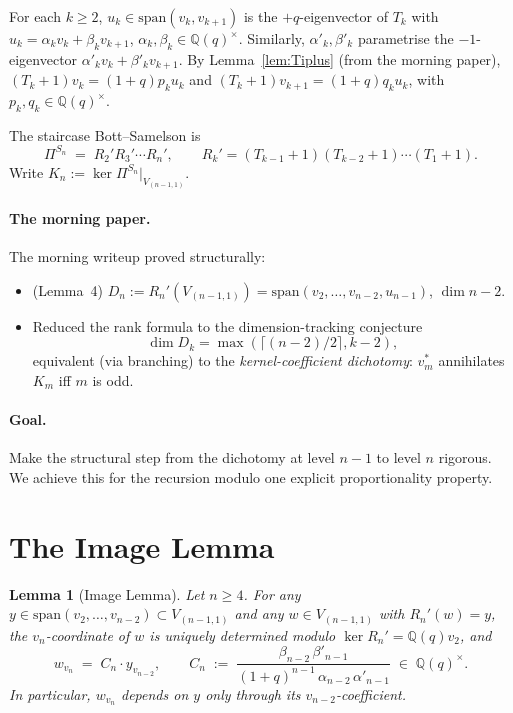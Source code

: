 \documentclass[11pt]{article}
\newtheorem{lemma}[theorem]{Lemma}
\theoremstyle{definition}
\begin{document}
For each $k \ge 2$, $u_k \in \mathrm{span}(v_k, v_{k+1})$ is the
$+q$-eigenvector of $T_k$ with $u_k = \alpha_k v_k + \beta_k v_{k+1}$,
$\alpha_k, \beta_k \in \mathbb{Q}(q)^\times$. Similarly, $\alpha'_k, \beta'_k$
parametrise the $-1$-eigenvector $\alpha'_k v_k + \beta'_k v_{k+1}$.
By Lemma~\ref{lem:Tiplus} (from the morning paper), $(T_k+1)v_k = (1+q)p_k u_k$
and $(T_k+1)v_{k+1} = (1+q)q_k u_k$, with $p_k, q_k \in \mathbb{Q}(q)^\times$.

The staircase Bott--Samelson is
\[
  \Pi^{S_n} \;=\; R_2' R_3' \cdots R_n', \qquad
  R_k' = (T_{k-1}+1)(T_{k-2}+1)\cdots(T_1+1).
\]
Write $K_n := \ker \Pi^{S_n}|_{V_{(n-1,1)}}$.

\paragraph{The morning paper.}
The morning writeup proved structurally:
\begin{itemize}[topsep=0.3em,itemsep=0.2em,leftmargin=2em]
\item (Lemma~4) $D_n := R_n'(V_{(n-1,1)}) = \mathrm{span}(v_2, \ldots, v_{n-2}, u_{n-1})$, $\dim n-2$.
\item Reduced the rank formula to the dimension-tracking conjecture
  \[ \dim D_k = \max(\lceil(n-2)/2\rceil, k-2), \]
  equivalent (via branching) to the \emph{kernel-coefficient dichotomy}:
  $v_m^*$ annihilates $K_m$ iff $m$ is odd.
\end{itemize}

\paragraph{Goal.}
Make the structural step from the dichotomy at level $n-1$ to level
$n$ rigorous. We achieve this for the recursion modulo one
explicit proportionality property.

\section{The Image Lemma}\label{sec:lemma}

\begin{lemma}[Image Lemma]\label{lem:image}
Let $n \ge 4$. For any $y \in \mathrm{span}(v_2, \ldots, v_{n-2}) \subset V_{(n-1,1)}$
and any $w \in V_{(n-1,1)}$ with $R_n'(w) = y$, the $v_n$-coordinate
of $w$ is uniquely determined modulo $\ker R_n' = \mathbb{Q}(q) v_2$, and
\begin{equation}\label{eq:lemma-image}
   w_{v_n} \;=\; C_n \cdot y_{v_{n-2}},
   \qquad
   C_n \;:=\; \frac{\beta_{n-2}\, \beta'_{n-1}}
                   {(1+q)^{n-1}\, \alpha_{n-2}\, \alpha'_{n-1}}
       \;\in\; \mathbb{Q}(q)^\times.
\end{equation}
In particular, $w_{v_n}$ depends on $y$ \emph{only} through its
$v_{n-2}$-coefficient.
\end{lemma}
\end{document}
